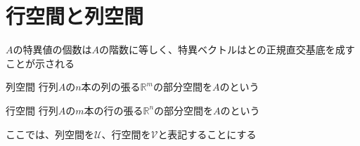 \documentclass[../../../topic_linear-algebra]{subfiles}
\begin{document}
\sectionline
\section{行空間と列空間}

$A$の特異値の個数は$A$の階数に等しく、特異ベクトルはとの正規直交基底を成すことが示される

\begin{definition}{列空間}
  行列$A$の$n$本の列の張る$\mathbb{R}^m$の部分空間を$A$のという
\end{definition}

\begin{definition}{行空間}
  行列$A$の$m$本の行の張る$\mathbb{R}^n$の部分空間を$A$のという
\end{definition}

ここでは、列空間を$\mathcal{U}$、行空間を$\mathcal{V}$と表記することにする
\end{document}
